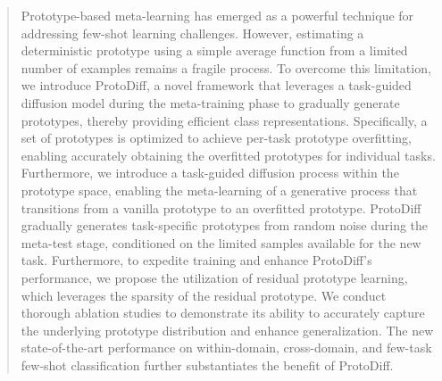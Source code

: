 
\begin{abstract}
%
Prototype-based meta-learning has emerged as a powerful technique for addressing few-shot learning challenges. However, estimating a deterministic prototype using a simple average function from a limited number of examples remains a fragile process. To overcome this limitation, we introduce ProtoDiff, a novel framework that leverages a task-guided diffusion model during the meta-training phase to gradually generate prototypes, thereby providing efficient class representations. Specifically,  a set of prototypes is optimized to achieve per-task prototype overfitting, enabling accurately obtaining the overfitted prototypes for individual tasks.
Furthermore, we introduce a task-guided diffusion process within the prototype space, enabling the meta-learning of a generative process that transitions from a vanilla prototype to an overfitted prototype. ProtoDiff gradually generates task-specific prototypes from random noise during the meta-test stage, conditioned on the limited samples available for the new task. Furthermore, to expedite training and enhance ProtoDiff's performance, we propose the utilization of residual prototype learning, which leverages the sparsity of the residual prototype. We conduct thorough ablation studies to demonstrate its ability to accurately capture the underlying prototype distribution and enhance generalization. The new state-of-the-art performance on within-domain, cross-domain, and few-task few-shot classiﬁcation further substantiates the beneﬁt of ProtoDiff.


\end{abstract}
